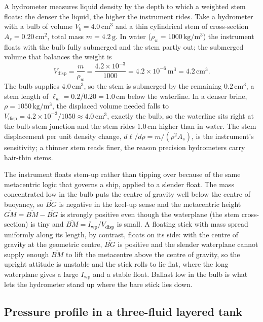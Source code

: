 A hydrometer measures liquid density by the depth to which a weighted stem
floats: the denser the liquid, the higher the instrument rides. Take a
hydrometer with a bulb of volume $V_b = 4.0\,\text{cm}^3$ and a thin
cylindrical stem of cross-section $A_s = 0.20\,\text{cm}^2$, total mass
$m = 4.2\,\si{\gram}$. In water ($\rho_w = 1000\,\si{\kilogram\per\meter
\cubed}$) the instrument floats with the bulb fully submerged and the stem
partly out; the submerged volume that balances the weight is
\[
V_{\text{disp}} = \frac{m}{\rho_w}
= \frac{4.2 \times 10^{-3}}{1000}
= 4.2 \times 10^{-6}\,\text{m}^3
= 4.2\,\text{cm}^3.
\]
The bulb supplies $4.0\,\text{cm}^3$, so the stem is submerged by the
remaining $0.2\,\text{cm}^3$, a stem length of
$\ell_w = 0.2/0.20 = 1.0\,\si{\centi\meter}$ below the waterline. In a
denser brine, $\rho = 1050\,\si{\kilogram\per\meter\cubed}$, the displaced
volume needed falls to $V_{\text{disp}} = 4.2\times10^{-3}/1050
\approx 4.0\,\text{cm}^3$, exactly the bulb, so the waterline sits right at
the bulb-stem junction and the stem rides $1.0\,\si{\centi\meter}$ higher
than in water. The stem displacement per unit density change,
$d\ell/d\rho = m/(\rho^2 A_s)$, is the instrument's sensitivity; a thinner
stem reads finer, the reason precision hydrometers carry hair-thin stems.

The instrument floats stem-up rather than tipping over because of the same
metacentric logic that governs a ship, applied to a slender float. The
mass concentrated low in the bulb puts the centre of gravity well below the
centre of buoyancy, so $\overline{BG}$ is negative in the keel-up sense and
the metacentric height $\overline{GM} = \overline{BM} - \overline{BG}$ is
strongly positive even though the waterplane (the stem cross-section) is
tiny and $\overline{BM} = I_{\text{wp}}/V_{\text{disp}}$ is small. A
floating stick with mass spread uniformly along its length, by contrast,
floats on its side: with the centre of gravity at the geometric centre,
$\overline{BG}$ is positive and the slender waterplane cannot supply enough
$\overline{BM}$ to lift the metacentre above the centre of gravity, so the
upright attitude is unstable and the stick rolls to lie flat, where the
long waterplane gives a large $I_{\text{wp}}$ and a stable float. Ballast
low in the bulb is what lets the hydrometer stand up where the bare stick
lies down.

\subsection{Pressure profile in a three-fluid layered tank}


